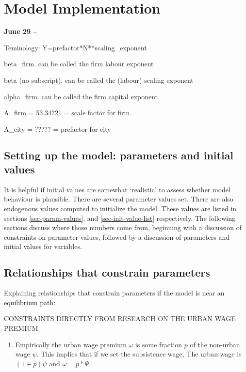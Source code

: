 \chapter[Model Implementation]{Model Implementation}
\textbf{June 29 --}

Teminology: Y=prefactor*N**scaling\_exponent

beta\_firm.  can be called the firm labour exponent

beta  (no subscript).  can be called the  (labour) scaling  exponent

alpha\_firm.   can be called the firm capital exponent


A\_firm = 53.34721 = scale factor for  firm. 

A\_city =  ????? = prefactor for city

\section{Setting up the model: parameters and initial values}
It is helpful if initial values are somewhat `realistic' to assess whether model behaviour is plausible. 
There are several parameter values set. There are also endogenous values computed to initialize the model. These values are listed in sections \ref{sec-param-values}, and \ref{sec-init-value-list} respectively. The following sections discuss where those numbers come from, beginning with a discussion of constraints on parameter values, followed by a discussion of parameters and initial values for variables. %

\section{Relationships that constrain parameters }

Explaining relationships that constrain parameters if the model is near an equilibrium path: 

CONSTRAINTS DIRECTLY FROM RESEARCH ON THE URBAN WAGE PREMIUM
\begin{enumerate}
     \item  Empirically the urban wage premium  $\omega$ is some fraction $p$ of the non-urban wage $\psi$.   This implies that if we set the subsistence wage, The urban wage is $(1+p)\psi$ and $\omega= p*\Psi$.
\end{enumerate}

